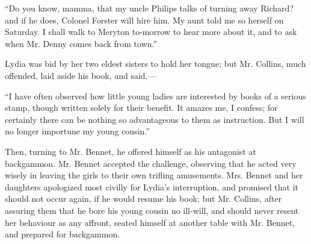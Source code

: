 ``Do you know, mamma, that my uncle Philips talks of turning away Richard? and if he does, Colonel Forster will hire him. My aunt told me so herself on Saturday. I shall walk to Meryton to-morrow to hear more about it, and to ask when Mr. Denny comes back from town.''

Lydia was bid by her two eldest sisters to hold her tongue; but Mr. Collins, much offended, laid aside his book, and said,---

``I have often observed how little young ladies are interested by books of a serious stamp, though written solely for their benefit. It amazes me, I confess; for certainly there can be nothing so advantageous to them as instruction. But I will no longer importune my young cousin.''

Then, turning to Mr. Bennet, he offered himself as his antagonist at backgammon. Mr. Bennet accepted the challenge, observing that he acted very wisely in leaving the girls to their own trifling amusements. Mrs. Bennet and her daughters apologized most civilly for Lydia's interruption, and promised that it should not occur again, if he would resume his book; but Mr. Collins, after assuring them that he bore his young cousin no ill-will, and should never resent her behaviour as any affront, seated himself at another table with Mr. Bennet, and prepared for backgammon.

